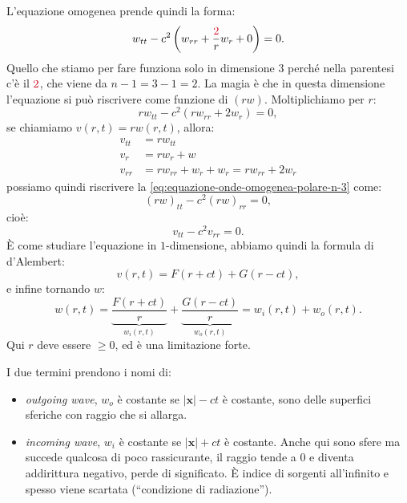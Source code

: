 \documentclass[10pt,a4paper,twoside,openright]{book}
\newcommand{\x}{\mathbf{x}}
\begin{document}
L'equazione omogenea prende quindi la forma:
\begin{equation}
	w_{tt} -c^{2}\left( w_{rr} +\frac{\textcolor[rgb]{0.82,0.01,0.11}{2}}{r} w_{r} +0\right) =0.
	\label{eq:equazione-onde-omogenea-polare-n-3}
\end{equation}
Quello che stiamo per fare funziona solo in dimensione $3$ perché nella parentesi c'è il $\textcolor[rgb]{0.82,0.01,0.11}{2}$, che viene da $n-1=3-1=2$. La magia è che in questa dimensione l'equazione si può riscrivere come funzione di $( rw)$. Moltiplichiamo per $r$:
\begin{equation*}
	rw_{tt} -c^{2}( rw_{rr} +2w_{r}) =0,
\end{equation*}
se chiamiamo $v( r,t) =rw( r,t)$, allora:
\begin{align*}
	v_{tt} & =rw_{tt}                                \\
	v_{r}  & =rw_{r} +w                              \\
	v_{rr} & =rw_{rr} +w_{r} +w_{r} =rw_{rr} +2w_{r} 
\end{align*}
possiamo quindi riscrivere la \eqref{eq:equazione-onde-omogenea-polare-n-3} come:
\begin{equation}
	( rw)_{tt} -c^{2}( rw)_{rr} =0,
\end{equation}
cioè:
\begin{equation}
	v_{tt} -c^{2} v_{rr} =0.
\end{equation}
È come studiare l'equazione in $1$-dimensione, abbiamo quindi la formula di d'Alembert:
\begin{equation}
	v( r,t) =F( r+ct) +G( r-ct) ,
\end{equation}
e infine tornando $w$:
\begin{equation}
	\boxed{w( r,t) =\underbrace{\frac{F( r+ct)}{r}}_{w_{i}( r,t)} +\underbrace{\frac{G( r-ct)}{r}}_{w_{o}( r,t)} =w_{i}( r,t) +w_{o}( r,t)} .
\end{equation}
Qui $r$ deve essere $\geqslant 0$, ed è una limitazione forte.

I due termini prendono i nomi di:
\begin{itemize}
	\item \textit{outgoing wave}, $w_{o}$ è costante se $| \x| -ct$ è costante, sono delle superfici sferiche con raggio che si allarga.
	\item \textit{incoming wave}, $w_{i}$ è costante se $| \x| +ct$ è costante. Anche qui sono sfere ma succede qualcosa di poco rassicurante, il raggio tende a $0$ e diventa addirittura negativo, perde di significato. È indice di sorgenti all'infinito e spesso viene scartata (``condizione di radiazione'').
\end{itemize}
\end{document}

